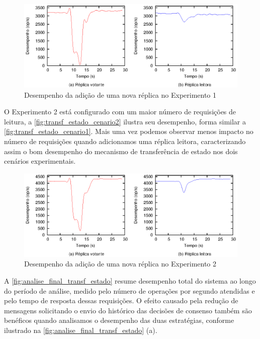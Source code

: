 \begin{figure}[ht]
  \centering
  \includegraphics[width=14cm]{conteudo/capitulos/figuras/final-transf-estado-pr50.eps}
  \caption{Desempenho da adição de uma nova réplica no Experimento 1}
  \label{fig:transf_estado_cenario1}
\end{figure}

O Experimento 2 está configurado com um maior número de requisições de leitura, a
\autoref{fig:transf_estado_cenario2} ilustra seu desempenho, forma similar a
\autoref{fig:transf_estado_cenario1}. Mais uma vez podemos observar menos impacto no
número de requisições quando adicionamos uma réplica leitora, caracterizando assim o bom
desempenho do mecanismo de transferência de estado nos dois cenários experimentais.

\begin{figure}[ht]
  \centering
  \includegraphics[width=14cm]{conteudo/capitulos/figuras/final-transf-estado-pr80.eps}
  \caption{Desempenho da adição de uma nova réplica no Experimento 2}
  \label{fig:transf_estado_cenario2}
\end{figure}

A \autoref{fig:analise_final_transf_estado} resume desempenho total do sistema ao longo do
período de análise, medido pelo número de operações por segundo atendidas e pelo tempo de
resposta dessas requisições. O efeito causado pela redução de mensagens solicitando o
envio do histórico das decisões de consenso também são benéficos quando analisamos o
desempenho das duas estratégias, conforme ilustrado na
\autoref{fig:analise_final_transf_estado} (a).

